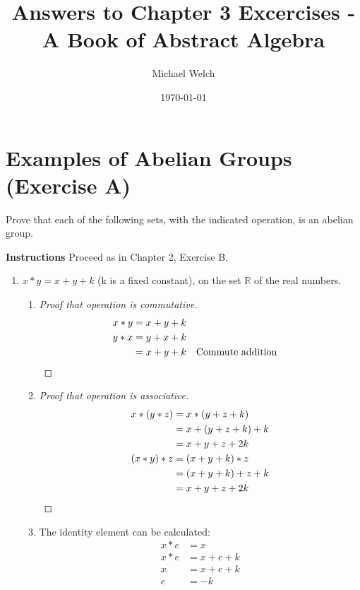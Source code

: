 \documentclass[draft,twoside]{amsart}
\newcommand{\Reals}{\mathbb{R}{}}
\begin{document}
\title{Answers to Chapter 3 Excercises - A Book of Abstract Algebra}
\author{Michael Welch}
\date{\today}
\maketitle

\section{Examples of Abelian Groups (Exercise A)}

Prove that each of the following sets, with the indicated operation, is an
abelian group.

\textbf{Instructions} Proceed as in Chapter 2, Exercise B.

\begin{enumerate}
   \item $x * y = x + y + k$ (k is a fixed constant), on the set 
   $\Reals$ of the real numbers.

   \begin{enumerate} %
      \item 
      \begin{proof}[Proof that operation is commutative]
         \begin{align*}
	    x * y & = x + y + k \\
	    y * x & = y + x + k \\
	          & = x + y + k && \text{Commute addition} \qedhere
	 \end{align*}
      \end{proof}

      \item 
      \begin{proof}[Proof that operation is associative]
         \begin{align*}
	    x * (y * z) & = x * (y + z + k) \\
	                & = x + (y + z + k) + k \\
			& = x + y + z + 2k \\
	    (x * y) * z & = (x + y + k) * z \\
	                & = (x + y + k) + z + k \\
			& = x + y + z + 2k \qedhere
	 \end{align*}
      \end{proof}

      \item The identity element can be calculated:
      \begin{align*}
         x * e & = x         \\
         x * e & = x + e + k \\
	     x & = x + e + k \\
	     e & = -k
      \end{align*}


\end{enumerate}
\end{enumerate}
\end{document}
